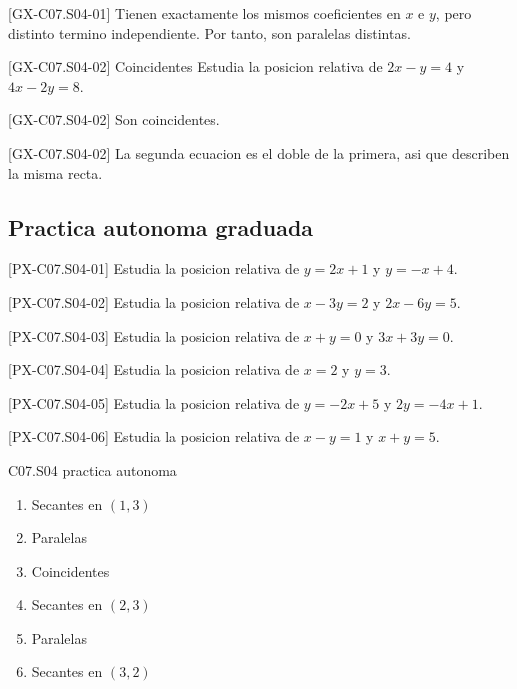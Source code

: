 \begin{fullsolution}{[GX-C07.S04-01]}
Tienen exactamente los mismos coeficientes en \(x\) e \(y\), pero distinto termino
independiente. Por tanto, son paralelas distintas.
\end{fullsolution}

\begin{guidedexercise}{[GX-C07.S04-02] Coincidentes}
Estudia la posicion relativa de \(2x-y=4\) y \(4x-2y=8\).
\end{guidedexercise}

\begin{shortanswer}{[GX-C07.S04-02]}
Son coincidentes.
\end{shortanswer}

\begin{fullsolution}{[GX-C07.S04-02]}
La segunda ecuacion es el doble de la primera, asi que describen la misma recta.
\end{fullsolution}

\subsection*{Practica autonoma graduada}
\begin{exercise}{[PX-C07.S04-01] Estudia la posicion relativa de \(y=2x+1\) y \(y=-x+4\).}
\end{exercise}
\begin{exercise}{[PX-C07.S04-02] Estudia la posicion relativa de \(x-3y=2\) y \(2x-6y=5\).}
\end{exercise}
\begin{exercise}{[PX-C07.S04-03] Estudia la posicion relativa de \(x+y=0\) y \(3x+3y=0\).}
\end{exercise}
\begin{exercise}{[PX-C07.S04-04] Estudia la posicion relativa de \(x=2\) y \(y=3\).}
\end{exercise}
\begin{exercise}{[PX-C07.S04-05] Estudia la posicion relativa de \(y=-2x+5\) y \(2y=-4x+1\).}
\end{exercise}
\begin{exercise}{[PX-C07.S04-06] Estudia la posicion relativa de \(x-y=1\) y \(x+y=5\).}
\end{exercise}

\begin{shortanswer}{C07.S04 practica autonoma}
\begin{enumerate}[label=\textbf{PX-C07.S04-\arabic*:}, leftmargin=*]
  \item Secantes en \((1,3)\)
  \item Paralelas
  \item Coincidentes
  \item Secantes en \((2,3)\)
  \item Paralelas
  \item Secantes en \((3,2)\)
\end{enumerate}
\end{shortanswer}

